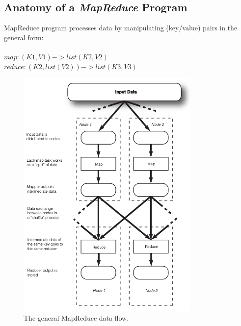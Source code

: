 \documentclass{article}
\begin{document}
\begin{multicols}{2}
\subsection{Anatomy of a \emph{MapReduce} Program}
MapReduce program processes data by manipulating (key/value) pairs in the general form:\\\\
$map: (K1,V1) -> list(K2,V2)$\\
$reduce: (K2,list(V2)) -> list(K3,V3)$\\
\begin{figure}[H]
\centering
\includegraphics[width=9cm]{assets/anatomy.png}
\caption{The general MapReduce data flow.}
\label{fig:awesome_image}
\end{figure}


\end{multicols}
\end{document}
